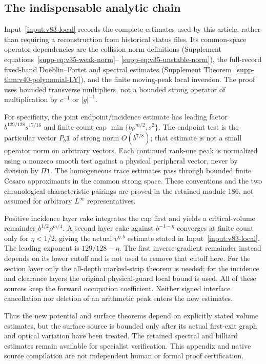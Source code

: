 \subsection{The indispensable analytic chain}
Input~\ref{input:v83-local} records the complete estimates used by this
article, rather than requiring a reconstruction from historical status
files. Its common-space operator dependencies are the collision norm
definitions (Supplement equations~\eqref{supp-eq:v35-weak-norm}--
\eqref{supp-eq:v35-unstable-norm}), the full-record fixed-band
Doeblin--Fortet and spectral estimates (Supplement
Theorem~\ref{supp-thm:v40-polynomial-LY}), and the finite moving-peak
local inversion. The proof uses bounded transverse multipliers, not a
bounded strong operator of multiplication by $c^{-1}$ or $|g|^{-1}$.

For specificity, the joint endpoint/incidence estimate has leading
factor $b^{129/128}s^{17/16}$ and finite-count cap
$\min\{b\rho^{m/2},s^2\}$. The endpoint test is the particular
vector $P_b\mathbf1$ of strong norm $O(b^{7/8})$; that estimate is
not a small operator norm on arbitrary vectors. Each continued
rank-one peak is normalized using a nonzero smooth test against a
physical peripheral vector, never by division by $\Pi\mathbf1$.
The homogeneous trace estimates pass through bounded finite Cesaro
approximants in the common strong space. These conventions and the
two chronological characteristic pairings are proved in the retained
module 186, not assumed for arbitrary $L^\infty$ representatives.

Positive incidence layer cake integrates the cap first and yields
a critical-volume remainder $b^{1/2}\rho^{m/4}$. A second layer cake
against $b^{-1-\eta}$ converges at finite count only for
$\eta<1/2$, giving the actual $v^{\eta,b}$ estimate stated in
Input~\ref{input:v83-local}. The leading exponent is $129/128-\eta$.
The first inverse-gradient remainder instead depends on its lower
cutoff and is not used to remove that cutoff here. For the section
layer only the all-depth marked-strip theorem is needed; for the
incidence and clearance layers the original physical-guard local
bound is used. All of these sources keep the forward occupation
coefficient. Neither signed interface cancellation nor deletion of
an arithmetic peak enters the new estimates.

Thus the new potential and surface theorems depend on explicitly
stated volume estimates, but the surface source is bounded only after
its actual first-exit graph and optical variation have been treated.
The retained spectral and billiard estimates remain available for
specialist verification. This appendix and native source compilation
are not independent human or formal proof certification.

